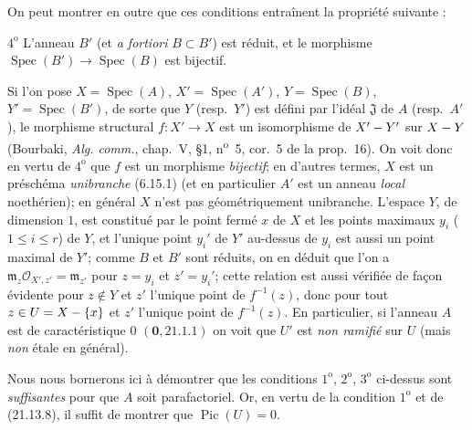 \begin{examples}[21.13.9]
On peut montrer en outre que ces conditions entraînent la propriété suivante :

$4^{\mathrm o}$ L'anneau $B'$ (et \emph{a fortiori} $B\subset B'$) est réduit, et le
morphisme $\operatorname{Spec}(B')\to\operatorname{Spec}(B)$ est bijectif.

Si l'on pose $X=\operatorname{Spec}(A)$, $X'=\operatorname{Spec}(A')$,
$Y=\operatorname{Spec}(B)$, $Y'=\operatorname{Spec}(B')$, de sorte que $Y$
(resp.\ $Y'$) est défini par l'idéal $\mathfrak J$ de $A$ (resp.\ $A'$), le morphisme
structural $f:X'\to X$ est un isomorphisme de $X'- Y'$ sur $X- Y$ (Bourbaki,
\emph{Alg. comm.}, chap.~V, \S1, n\textsuperscript{o}~5, cor.~5 de la prop.~16). On
voit donc en vertu de $4^{\mathrm o}$ que $f$ est un morphisme \emph{bijectif}; en
d'autres termes, $X$ est un préschéma \emph{unibranche} (6.15.1) (et en particulier
$A'$ est un anneau \emph{local} noethérien); en général $X$ n'est pas géométriquement
unibranche. L'espace $Y$, de dimension $1$, est constitué par le point fermé $x$ de
$X$ et les points maximaux $y_i$ ($1\leq i\leq r$) de $Y$, et l'unique point $y_i'$
de $Y'$ au-dessus de $y_i$ est aussi un point maximal de $Y'$; comme $B$ et $B'$ sont
réduits, on en déduit que l'on a $\mathfrak m_z\mathcal O_{X',z'}=\mathfrak m_{z'}$
pour $z=y_i$ et $z'=y_i'$; cette relation est aussi vérifiée de façon évidente pour
$z\notin Y$ et $z'$ l'unique point de $f^{-1}(z)$, donc pour tout
$z\in U=X-\{x\}$ et $z'$ l'unique point de $f^{-1}(z)$. En particulier, si l'anneau
$A$ est de caractéristique $0$ $(\mathbf 0, 21.1.1)$ on voit que $U'$ est \emph{non ramifié} sur
$U$ (mais \emph{non} étale en général).

Nous nous bornerons ici à démontrer que les conditions $1^{\mathrm o}$,
$2^{\mathrm o}$, $3^{\mathrm o}$ ci-dessus sont \emph{suffisantes} pour que $A$ soit
parafactoriel. Or, en vertu de la condition $1^{\mathrm o}$ et de (21.13.8), il suffit
de montrer que $\operatorname{Pic}(U)=0$.


\end{examples}

